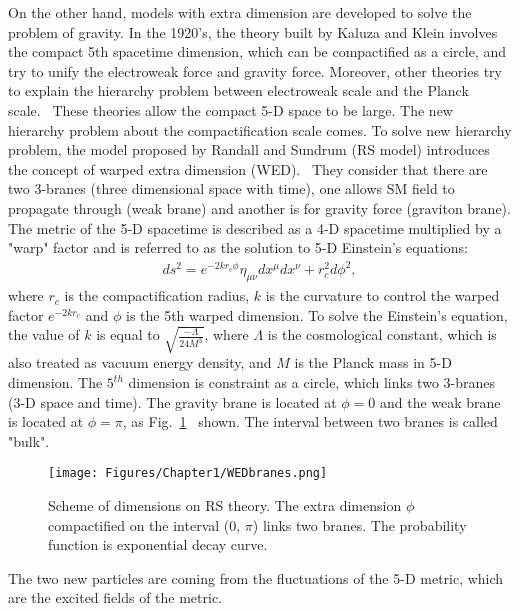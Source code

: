 On the other hand, models with extra dimension are developed to solve the problem of gravity.
In the 1920's, the theory built by Kaluza and Klein involves the compact 5th spacetime dimension, which can be compactified as a circle, and try to unify the electroweak force and gravity force.
Moreover, other theories try to explain the hierarchy problem between electroweak scale and the Planck scale.~\cite{hep-ph/9803315}
These theories allow the compact 5-D space to be large. The new hierarchy problem about the compactification scale comes.
To solve new hierarchy problem, the model proposed by Randall and Sundrum (RS model) introduces the concept of warped extra dimension (WED).~\cite{hep-ph/9905221}
They consider that there are two 3-branes (three dimensional space with time), one allows SM field to propagate through (weak brane) and another is for gravity force (graviton brane).
The metric of the 5-D spacetime is described as a 4-D spacetime multiplied by a "warp" factor and is referred to as the solution to 5-D Einstein’s equations:
\begin{equation} \label{eq:WarpedMetric}
  \begin{aligned}
	ds^{2}=e^{-2kr_{c}\phi}\eta_{\mu\nu}dx^{\mu}dx^{\nu}+r_{c}^{2}d\phi^{2},
  \end{aligned}
\end{equation}
where $r_{c}$ is the compactification radius, $k$ is the curvature to control the warped factor $e^{-2kr_{c}}$ and $\phi$ is the 5th warped dimension.
To solve the Einstein’s equation, the value of $k$ is equal to $\sqrt{\frac{-\Lambda}{24M^{3}}}$, where $\Lambda$ is the cosmological constant, which is also treated as vacuum energy density, and $M$ is the Planck mass in 5-D dimension.
The $5^{th}$ dimension is constraint as a circle, which links two 3-branes (3-D space and time).
The gravity brane is located at $\phi=0$ and the weak brane is located at $\phi=\pi$, as Fig.~\ref{fig:WEDbranes}~\cite{1404.0102} shown.
The interval between two branes is called "bulk".
\begin{figure}[h]
  \centering
  \texttt{[image: Figures/Chapter1/WEDbranes.png]}
  \caption{Scheme of dimensions on RS theory. The extra dimension $\phi$ compactified on the interval (0, $\pi$) links two branes. The probability function is exponential decay curve.}
  \label{fig:WEDbranes}
\end{figure}
The two new particles are coming from the fluctuations of the 5-D metric, which are the excited fields of the metric.
